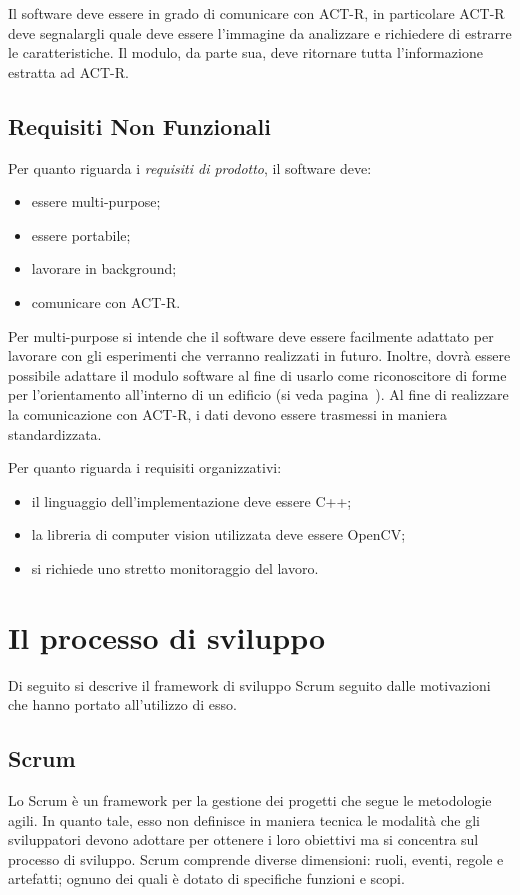 			Il software deve essere in grado di comunicare con \mbox{ACT-R}, in particolare \mbox{ACT-R} deve segnalargli quale deve essere l'immagine da analizzare e richiedere di estrarre le caratteristiche.
			Il modulo, da parte sua, deve ritornare tutta l'informazione estratta ad \mbox{ACT-R}.
		
		\subsection*{Requisiti Non Funzionali}
			Per quanto riguarda i \emph{requisiti di prodotto}, il software deve:
			\begin{itemize}
				\item essere multi-purpose;
				\item essere portabile;
			   \item lavorare in background;			
				\item comunicare con \mbox{ACT-R}.			
			\end{itemize}
			
		Per multi-purpose si intende che il software deve essere facilmente adattato per lavorare con gli esperimenti che verranno realizzati in futuro.
		Inoltre, dovrà essere possibile adattare il modulo software al fine di usarlo come riconoscitore di forme per l'orientamento all'interno di un edificio (si veda pagina~\pageref{obiettivi}).
		Al fine di realizzare la comunicazione con \mbox{ACT-R}, i dati devono essere trasmessi in maniera standardizzata.

		Per quanto riguarda i requisiti organizzativi:
		\begin{itemize}
				\item il linguaggio dell'implementazione deve essere C++;
				\item la libreria di computer vision utilizzata deve essere \mbox{OpenCV};
			   \item si richiede uno stretto monitoraggio del lavoro.					
			\end{itemize}	

	\section*{Il processo di sviluppo}
		Di seguito si descrive il framework di sviluppo Scrum seguito dalle motivazioni che hanno portato all'utilizzo di esso.
		
		\subsection*{Scrum}
			Lo Scrum è un framework per la gestione dei progetti che segue le metodologie agili.
			In quanto tale, esso non definisce in maniera tecnica le modalità che gli sviluppatori devono adottare per ottenere i loro obiettivi ma si concentra sul processo di sviluppo.
			Scrum comprende diverse dimensioni: ruoli, eventi, regole e artefatti; ognuno dei quali è dotato di specifiche funzioni e scopi.
			
